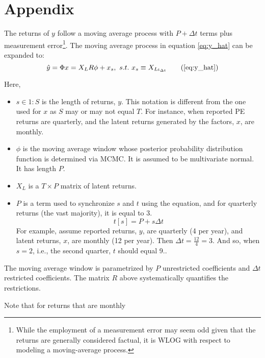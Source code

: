 \documentclass[11pt]{article}
\begin{document}
\clearpage

\section*{Appendix} 
\label{sec:appendix}
The returns of $y$ follow a moving average process with $P + \Delta t$ terms plus measurement error\footnote{While the employment of a measurement error may seem odd given that the returns are generally considered factual, it is WLOG with respect to modeling a moving-average process.}. The moving average process in equation \eqref{eq:y_hat} can be expanded to:
\begin{equation}
	\hat{y} = \Phi x = X_L R \phi + x_s, ~s.t.~ x_s \equiv X_{L\iota_{\Delta t}} \tag{\ref{eq:y_hat}}
\end{equation}

Here, 
\begin{itemize}
	\item $s \in 1:S$ is the length of returns, $y$. This notation is different from the one used for $x$ as $S$ may or may not equal $T$. For instance, when reported PE returns are quarterly, and the latent returns generated by the factors, $x$, are monthly. 
	\item $\phi$ is the moving average window whose posterior probability distribution function is determined via MCMC. It is assumed to be multivariate normal. It has length $P$.
	\item $X_L$ is a $T \times P$ matrix of latent returns.
	\item $P$ is a term used to synchronize $s$ and $t$ using the equation, and for quarterly returns (the vast majority), it is equal to 3.
	\begin{equation}
		t[s] = P + s \Delta t
	\end{equation}
	For example, assume reported returns, $y$, are quarterly (4 per year), and latent returns, $x$, are monthly (12 per year). Then $\Delta t = \frac{12}{4} = 3$. And so, when $s=2$, i.e., the second quarter, $t$ should equal 9..
\end{itemize}

The moving average window is parametrized by $P$ unrestricted coefficients and $\Delta t$ restricted coefficients. The matrix $R$ above systematically quantifies the restrictions. 

Note that for returns that are monthly 
\end{document}
